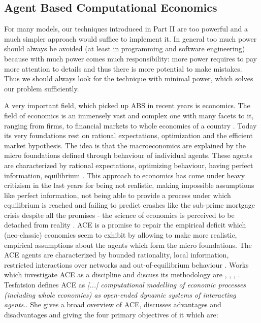 \subsection{Agent Based Computational Economics}
For many models, our techniques introduced in Part II are too powerful and a much simpler approach would suffice to implement it. In general too much power should always be avoided (at least in programming and software engineering) because with much power comes much responsibility: more power requires to pay more attention to details and thus there is more potential to make mistakes. Thus we should always look for the technique with minimal power, which solves our problem sufficiently.

A very important field, which picked up ABS in recent years is economics. The field of economics is an immensely vast and complex one with many facets to it, ranging from firms, to financial markets to whole economies of a country \cite{bowles_understanding_2005}. Today its very foundations rest on rational expectations, optimization and the efficient market hypothesis. The idea is that the macroeconomics are explained by the micro foundations \cite{colell_microeconomic_1995} defined through behaviour of individual agents. These agents are characterized by rational expectations, optimizing behaviour, having perfect information, equilibrium \cite{focardi_is_2015}.
This approach to economics has come under heavy critizism in the last years for being not realistic, making impossible assumptions like perfect information, not being able to provide a process under which equilibrium is reached \cite{kirman_complex_2010} and failing to predict crashes like the sub-prime mortgage crisis despite all the promises - the science of economics is perceived to be detached from reality \cite{focardi_is_2015}. 
ACE is a promise to repair the empirical deficit which (neo-classic) economics seem to exhibit by allowing to make more realistic, empirical assumptions about the agents which form the micro foundations. The ACE agents are characterized by bounded rationality, local information, restricted interactions over networks and out-of-equilibrium behaviour \cite{farmer_economy_2009}. 
Works which investigate ACE as a discipline and discuss its methodology are \cite{tesfatsion_agent-based_2002}, \cite{richiardi_agent-based_2007}, \cite{ballot_agent-based_2015}, \cite{blume_introduction_2015}.
Tesfatsion \cite{tesfatsion_agent-based_2017} defines ACE as \textit{[...] computational modelling of economic processes (including whole economies) as open-ended dynamic systems of interacting agents.}. She gives a broad overview \cite{tesfatsion_agent-based_2006} of ACE, discusses advantages and disadvantages and giving the four primary objectives of it which are:

